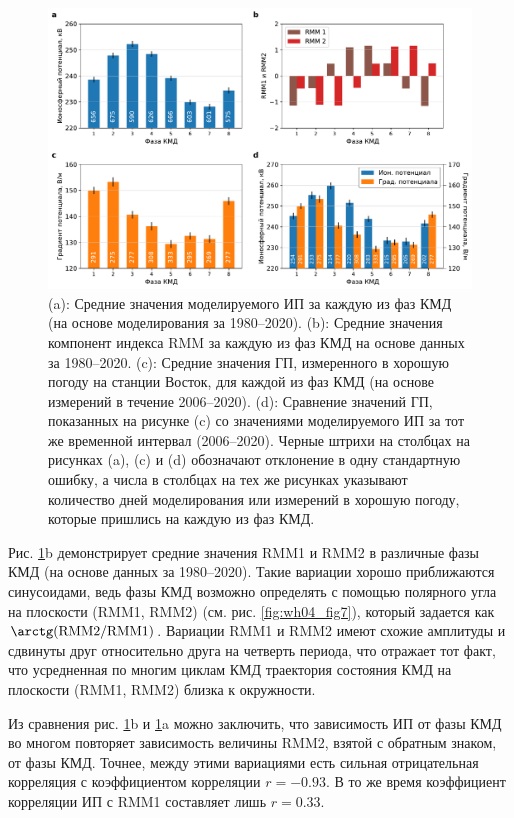 \begin{figure} 
    \centering
    \includegraphics[width=\textwidth]{figures/variations.pdf}
    \caption{(a): Средние значения моделируемого ИП за каждую из фаз КМД (на основе моделирования за 1980--2020). (b): Средние значения компонент индекса RMM за каждую из фаз КМД на основе данных за 1980--2020. (c): Средние значения ГП, измеренного в хорошую погоду на станции Восток, для каждой из фаз КМД (на основе измерений в течение 2006--2020). (d): Сравнение значений ГП, показанных на рисунке (c) со значениями моделируемого ИП за тот же временной интервал (2006--2020). Черные штрихи на столбцах на рисунках (a), (c) и (d) обозначают отклонение в одну стандартную ошибку, а числа в столбцах на тех же рисунках указывают количество дней моделирования или измерений в хорошую погоду, которые пришлись на каждую из фаз КМД.}
    \label{fig:variations}
\end{figure}

Рис. \ref{fig:variations}{b} демонстрирует средние значения RMM1 и RMM2 в различные фазы КМД (на основе данных за 1980--2020). Такие вариации хорошо приближаются синусоидами, ведь фазы КМД возможно определять с помощью полярного угла на плоскости (RMM1, RMM2) (см. рис. \ref{fig:wh04_fig7}), который задается как $\arctg(\mathrm{RMM2}/\mathrm{RMM1})$. Вариации RMM1 и RMM2 имеют схожие амплитуды и сдвинуты друг относительно друга на четверть периода, что отражает тот факт, что усредненная по многим циклам КМД траектория состояния КМД на плоскости (RMM1, RMM2) близка к окружности.

Из сравнения рис. \ref{fig:variations}{b} и \ref{fig:variations}{a} можно заключить, что зависимость ИП от фазы КМД во многом повторяет зависимость величины RMM2, взятой с обратным знаком, от фазы КМД. Точнее, между этими вариациями есть сильная отрицательная корреляция с коэффициентом корреляции $r=-0.93$. В то же время коэффициент корреляции ИП с RMM1 составляет лишь $r=0.33$.

